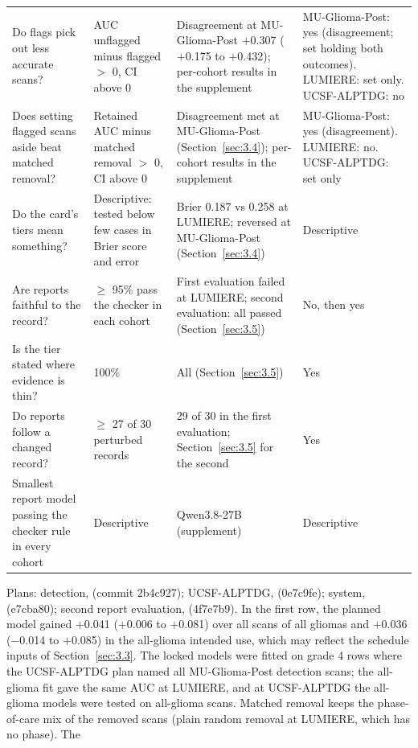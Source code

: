 \documentclass[largeformat]{interact} %
\begin{document}
\begin{table}[!htbp]
\begin{threeparttable}
\begin{tabularx}{\linewidth}{@{}R{3.4cm}R{3.9cm}LR{1.6cm}@{}}
Do flags pick out less accurate scans? & AUC unflagged minus flagged $>$ 0, CI above 0 & Disagreement at MU-Glioma-Post $+$0.307 ($+$0.175 to $+$0.432); per-cohort results in the supplement & MU-Glioma-Post: yes (disagree\-ment; set holding both outcomes). LUMIERE: set only. UCSF-ALPTDG: no \\
Does setting flagged scans aside beat matched removal? & Retained AUC minus matched removal $>$ 0, CI above 0 & Disagreement met at MU-Glioma-Post (Section~\ref{sec:3.4}); per-cohort results in the supplement & MU-Glioma-Post: yes (disagree\-ment). LUMIERE: no. UCSF-ALPTDG: set only \\
Do the card's tiers mean something? & Descriptive: tested below few cases in Brier score and error & Brier 0.187 vs 0.258 at LUMIERE; reversed at MU-Glioma-Post (Section~\ref{sec:3.4}) & Descriptive \\
Are reports faithful to the record? & $\geq$ 95\% pass the checker in each cohort & First evaluation failed at LUMIERE; second evaluation: all passed (Section~\ref{sec:3.5}) & No, then yes \\
Is the tier stated where evidence is thin? & 100\% & All (Section~\ref{sec:3.5}) & Yes \\
Do reports follow a changed record? & $\geq$ 27 of 30 perturbed records & 29 of 30 in the first evaluation; Section~\ref{sec:3.5} for the second & Yes \\
Smallest report model passing the checker rule in every cohort & Descriptive & Qwen3.8-27B (supplement) & Descriptive \\
\bottomrule
\end{tabularx}
\begin{tablenotes}\footnotesize
\item Plans: detection,  (commit 2b4c927); UCSF-ALPTDG,  (0e7c9fe);
system,  (e7cba80); second report evaluation,  (4f7e7b9). In the
first row, the planned model gained $+$0.041 ($+$0.006 to $+$0.081) over all scans of all gliomas and $+$0.036
($-$0.014 to $+$0.085) in the all-glioma intended use, which may reflect the schedule inputs of
Section~\ref{sec:3.3}. The locked models were fitted on grade 4 rows where the
UCSF-ALPTDG plan named all MU-Glioma-Post detection scans; the all-glioma fit gave the same AUC at LUMIERE, and at
UCSF-ALPTDG the all-glioma models were tested on all-glioma scans. Matched
removal keeps the phase-of-care mix of the removed scans (plain random removal at LUMIERE, which has no phase). The

\end{tablenotes}
\end{threeparttable}
\end{table}
\end{document}
